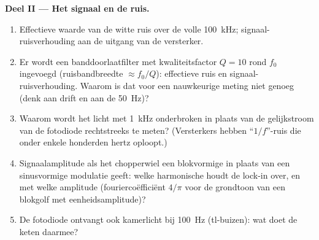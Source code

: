 \begin{problem}
\medskip
\noindent\textbf{Deel II --- Het signaal en de ruis.}
\begin{enumerate}[resume]
  \item Effectieve waarde van de witte ruis over de volle \qty{100}{kHz};
        signaal-ruisverhouding aan de uitgang van de versterker.
  \item Er wordt een banddoorlaatfilter met kwaliteitsfactor $Q = 10$ rond
        $f_0$ ingevoegd (ruisbandbreedte $\approx f_0/Q$): effectieve ruis
        en signaal-ruisverhouding. Waarom is dat voor een nauwkeurige meting
        niet genoeg (denk aan drift en aan de \qty{50}{Hz})?
  \item Waarom wordt het licht met \qty{1}{kHz} onderbroken in plaats van de
        gelijkstroom van de fotodiode rechtstreeks te meten? (Versterkers
        hebben ``$1/f$''-ruis die onder enkele honderden hertz oploopt.)
  \item Signaalamplitude als het chopperwiel een blokvormige in plaats van
        een sinusvormige modulatie geeft: welke harmonische houdt de lock-in
        over, en met welke amplitude (fouriercoëfficiënt $4/\pi$ voor de
        grondtoon van een blokgolf met eenheidsamplitude)?
  \item De fotodiode ontvangt ook kamerlicht bij \qty{100}{Hz} (tl-buizen):
        wat doet de keten daarmee?
\end{enumerate}


\end{problem}
